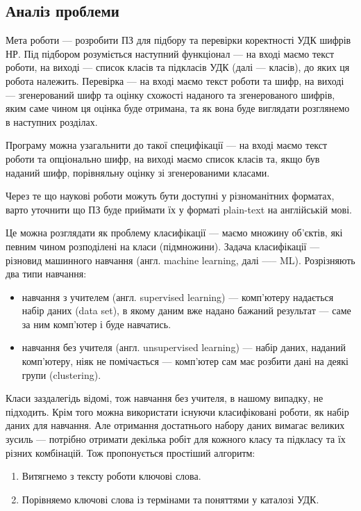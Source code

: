 \documentclass[14pt]{extarticle}
\begin{document}
  \subsection{Аналіз проблеми}
  Мета роботи ---
  розробити ПЗ для підбору та перевірки коректності УДК шифрів НР.
  Під підбором розуміється наступний функціонал --- на вході маємо текст роботи,
  на виході --- список класів та підкласів УДК (далі --- класів),
  до яких ця робота належить.
  Перевірка --- на вході маємо текст роботи та шифр,
  на виході --- згенерований шифр та оцінку схожості наданого
  та згенерованого шифрів, яким саме чином ця оцінка буде отримана,
  та як вона буде виглядати розглянемо в наступних розділах.
  
  Програму можна узагальнити до такої специфікації ---
  на вході маємо текст роботи та опціонально шифр,
  на виході маємо список класів та, якщо був наданий шифр,
  порівняльну оцінку зі згенерованими класами.

  Через те що наукові роботи можуть бути доступні у різноманітних форматах,
  варто уточнити що ПЗ буде приймати їх
  у форматі plain-text на англійській мові.

  Це можна розглядати як проблему класифікації
  \cite{multiclass_classification_wiki, statistical_classification_wiki}
  --- маємо множину об'єктів,
  які певним чином розподілені на класи (підмножини).
  Задача класифікації ---
  різновид машинного навчання
  \cite{machine_learning_wiki} (англ. machine learning, далі —-- ML).
  Розрізняють два типи навчання:
  \begin{itemize}[labelindent=\dimexpr{}\relax, leftmargin=*]
    \item навчання з учителем (англ. supervised learning) ---
    комп'ютеру надається набір даних (data set),
    в якому даним вже надано бажаний результат ---
    саме за ним комп'ютер і буде навчатись.

    \item навчання без учителя (англ. unsupervised learning) ---
    набір даних, наданий комп'ютеру, ніяк не помічається ---
    комп'ютер сам має розбити дані на деякі групи (clustering).
  \end{itemize}

  Класи заздалегідь відомі, тож навчання без учителя, в нашому випадку,
  не підходить. Крім того можна використати існуючи класифіковані роботи,
  як набір даних для навчання.
  Але отримання достатнього набору даних вимагає великих зусиль ---
  потрібно отримати декілька робіт для кожного класу та підкласу
  та їх різних комбінацій. Тож пропонується простіший алгоритм:
  \begin{enumerate}[labelindent=\dimexpr\parindent*2\relax, leftmargin=*]
    \item Витягнемо з тексту роботи ключові слова.\cite{keyword_extraction_wiki}
    \item Порівняемо ключові слова із термінами та поняттями у каталозі УДК.
  \end{enumerate}
\end{document}
